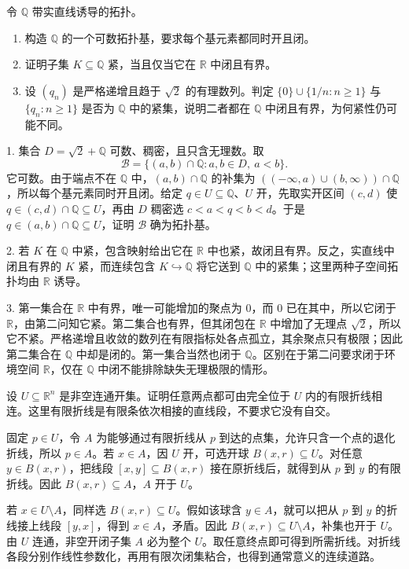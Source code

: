 \begin{exercise}\label{g1:exr:rationals-local-properties}
	令 \(\mathbb Q\) 带实直线诱导的拓扑。
	\begin{enumerate}
		\item 构造 \(\mathbb Q\) 的一个可数拓扑基，要求每个基元素都同时开且闭。
		\item 证明子集 \(K\subseteq\mathbb Q\) 紧，当且仅当它在 \(\mathbb R\) 中闭且有界。
		\item 设 \((q_n)\) 是严格递增且趋于 \(\sqrt2\) 的有理数列。判定 \(\{0\}\cup\{1/n:n\ge1\}\) 与 \(\{q_n:n\ge1\}\) 是否为 \(\mathbb Q\) 中的紧集，说明二者都在 \(\mathbb Q\) 中闭且有界，为何紧性仍可能不同。
	\end{enumerate}
\end{exercise}
\begin{solution}
	1. 集合 \(D=\sqrt2+\mathbb Q\) 可数、稠密，且只含无理数。取
	\[
		\mathcal B=\{(a,b)\cap\mathbb Q:a,b\in D,\ a<b\}.
	\]
	它可数。由于端点不在 \(\mathbb Q\) 中，\((a,b)\cap\mathbb Q\) 的补集为 \(((-\infty,a)\cup(b,\infty))\cap\mathbb Q\)，所以每个基元素同时开且闭。给定 \(q\in U\subseteq\mathbb Q\)、\(U\) 开，先取实开区间 \((c,d)\) 使 \(q\in(c,d)\cap\mathbb Q\subseteq U\)，再由 \(D\) 稠密选 \(c<a<q<b<d\)。于是 \(q\in(a,b)\cap\mathbb Q\subseteq U\)，证明 \(\mathcal B\) 确为拓扑基。

	2. 若 \(K\) 在 \(\mathbb Q\) 中紧，包含映射给出它在 \(\mathbb R\) 中也紧，故闭且有界。反之，实直线中闭且有界的 \(K\) 紧，而连续包含 \(K\hookrightarrow\mathbb Q\) 将它送到 \(\mathbb Q\) 中的紧集；这里两种子空间拓扑均由 \(\mathbb R\) 诱导。

	3. 第一集合在 \(\mathbb R\) 中有界，唯一可能增加的聚点为 \(0\)，而 \(0\) 已在其中，所以它闭于 \(\mathbb R\)，由第二问知它紧。第二集合也有界，但其闭包在 \(\mathbb R\) 中增加了无理点 \(\sqrt2\)，所以它不紧。严格递增且收敛的数列在有限指标处各点孤立，其余聚点只有极限；因此第二集合在 \(\mathbb Q\) 中却是闭的。第一集合当然也闭于 \(\mathbb Q\)。区别在于第二问要求闭于环境空间 \(\mathbb R\)，仅在 \(\mathbb Q\) 中闭不能排除缺失无理极限的情形。
\end{solution}

\begin{exercise}\label{g1:exr:polygonal-connected-open}
	设 \(U\subseteq\mathbb R^n\) 是非空连通开集。证明任意两点都可由完全位于 \(U\) 内的有限折线相连。这里有限折线是有限条依次相接的直线段，不要求它没有自交。
\end{exercise}
\begin{solution}
	固定 \(p\in U\)，令 \(A\) 为能够通过有限折线从 \(p\) 到达的点集，允许只含一个点的退化折线，所以 \(p\in A\)。若 \(x\in A\)，因 \(U\) 开，可选开球 \(B(x,r)\subseteq U\)。对任意 \(y\in B(x,r)\)，把线段 \([x,y]\subseteq B(x,r)\) 接在原折线后，就得到从 \(p\) 到 \(y\) 的有限折线。因此 \(B(x,r)\subseteq A\)，\(A\) 开于 \(U\)。

	若 \(x\in U\setminus A\)，同样选 \(B(x,r)\subseteq U\)。假如该球含 \(y\in A\)，就可以把从 \(p\) 到 \(y\) 的折线接上线段 \([y,x]\)，得到 \(x\in A\)，矛盾。因此 \(B(x,r)\subseteq U\setminus A\)，补集也开于 \(U\)。由 \(U\) 连通，非空开闭子集 \(A\) 必为整个 \(U\)。取任意终点即可得到所需折线。对折线各段分别作线性参数化，再用有限次闭集粘合，也得到通常意义的连续道路。
\end{solution}

